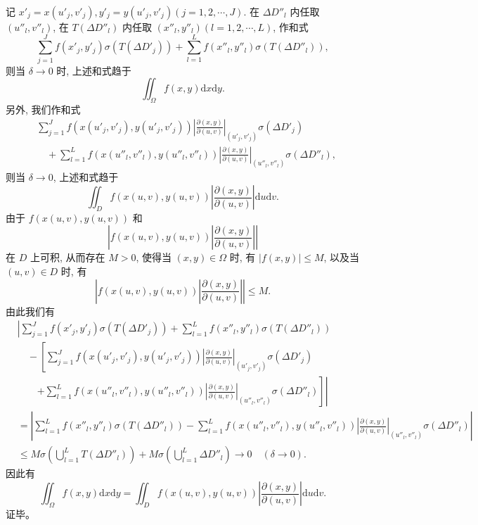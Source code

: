 \documentclass[UTF8,12pt,a4paper,fontset=fandol]{ctexart}
\begin{document}
记 $x'_j=x(u'_j,v'_j), y'_j=y(u'_j,v'_j)(j=1,2,\cdots,J)$. 在 $\Delta D''_l$ 内任取 $(u''_l,v''_l)$, 在 $T(\Delta D''_l)$ 内任取 $(x''_l,y''_l)(l=1,2,\cdots,L)$, 作和式
\begin{equation}
  \sum_{j=1}^J f(x'_j,y'_j)\sigma(T(\Delta D'_j))
  +\sum_{l=1}^L f(x''_l,y''_l)\sigma(T(\Delta D''_l)),
  \tag{15.4.1}
\end{equation}
则当 $\delta\to0$ 时, 上述和式趋于
\[
  \iint_\Omega f(x,y)\mathrm dx\mathrm dy.
\]
另外, 我们作和式
\begin{equation}
\begin{aligned}
  &\sum_{j=1}^J f(x(u'_j,v'_j),y(u'_j,v'_j))
  \left|\frac{\partial(x,y)}{\partial(u,v)}\right|_{(u'_j,v'_j)}
  \sigma(\Delta D'_j)\\
  &\quad+\sum_{l=1}^L f(x(u''_l,v''_l),y(u''_l,v''_l))
  \left|\frac{\partial(x,y)}{\partial(u,v)}\right|_{(u''_l,v''_l)}
  \sigma(\Delta D''_l),
\end{aligned}
  \tag{15.4.2}
\end{equation}
则当 $\delta\to0$, 上述和式趋于
\[
  \iint_D f(x(u,v),y(u,v))
  \left|\frac{\partial(x,y)}{\partial(u,v)}\right|\mathrm du\mathrm dv.
\]
由于 $f(x(u,v),y(u,v))$ 和
\[
  \left|f(x(u,v),y(u,v))\left|\frac{\partial(x,y)}{\partial(u,v)}\right|\right|
\]
在 $D$ 上可积, 从而存在 $M>0$, 使得当 $(x,y)\in\Omega$ 时, 有 $|f(x,y)|\leqslant M$, 以及当 $(u,v)\in D$ 时, 有
\[
  \left|f(x(u,v),y(u,v))\left|\frac{\partial(x,y)}{\partial(u,v)}\right|\right|\leqslant M.
\]
由此我们有
\[
\begin{aligned}
  &\left|
  \sum_{j=1}^J f(x'_j,y'_j)\sigma(T(\Delta D'_j))
  +\sum_{l=1}^L f(x''_l,y''_l)\sigma(T(\Delta D''_l))\right.\\
  &\quad-\left[
  \sum_{j=1}^J f(x(u'_j,v'_j),y(u'_j,v'_j))
  \left|\frac{\partial(x,y)}{\partial(u,v)}\right|_{(u'_j,v'_j)}
  \sigma(\Delta D'_j)\right.\\
  &\qquad\left.\left.
  +\sum_{l=1}^L f(x(u''_l,v''_l),y(u''_l,v''_l))
  \left|\frac{\partial(x,y)}{\partial(u,v)}\right|_{(u''_l,v''_l)}
  \sigma(\Delta D''_l)\right]\right|\\
  &=\left|
  \sum_{l=1}^L f(x''_l,y''_l)\sigma(T(\Delta D''_l))
  -\sum_{l=1}^L f(x(u''_l,v''_l),y(u''_l,v''_l))
  \left|\frac{\partial(x,y)}{\partial(u,v)}\right|_{(u''_l,v''_l)}
  \sigma(\Delta D''_l)\right|\\
  &\leqslant M\sigma\left(\bigcup_{l=1}^L T(\Delta D''_l)\right)
  +M\sigma\left(\bigcup_{l=1}^L\Delta D''_l\right)\to0\quad(\delta\to0).
\end{aligned}
\]
因此有
\[
  \iint_\Omega f(x,y)\mathrm dx\mathrm dy
  =\iint_D f(x(u,v),y(u,v))
  \left|\frac{\partial(x,y)}{\partial(u,v)}\right|\mathrm du\mathrm dv.
\]
证毕。
\end{document}
